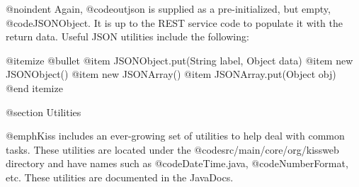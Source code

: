 @noindent
Again, @code{outjson} is supplied as a pre-initialized, but empty,
@code{JSONObject}.  It is up to the REST service code to populate it
with the return data.  Useful JSON utilities include the following:

@itemize @bullet
@item
JSONObject.put(String label, Object data)
@item
new JSONObject()
@item
new JSONArray()
@item
JSONArray.put(Object obj)
@end itemize


@section Utilities

@emph{Kiss} includes an ever-growing set of utilities to help deal with common tasks.
These utilities are located under the @code{src/main/core/org/kissweb} directory and have names such as
@code{DateTime.java}, @code{NumberFormat}, etc.  These utilities
are documented in the JavaDocs.
